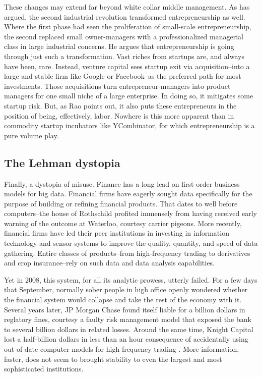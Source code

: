 \documentclass[12pt]{article}
\begin{document}
These changes may extend far beyond white collar middle management. As
\cite{rao2012} has argued, the second industrial revolution
transformed entrepreneurship as well. Where the first phase had seen
the proliferation of small-scale entrepreneurship, the second replaced
small owner-managers with a professionalized managerial class in large
industrial concerns. He argues that entrepreneurship is going through
just such a transformation. Vast riches from startups are, and always
have been, rare. Instead, venture capital sees startup exit via
acquisition--into a large and stable firm like Google or Facebook--as
the preferred path for most investments. Those acquisitions turn
entrepreneur-managers into product managers for one small niche of a
large enterprise. In doing so, it mitigates some startup risk. But, as
Rao points out, it also puts these entrepreneurs in the position of
being, effectively, labor. Nowhere is this more apparent than in
commodity startup incubators like YCombinator, for which
entrepreneurship is a pure volume play.


\subsection{The Lehman dystopia}
\label{sec:lehman-dystopia}

Finally, a dystopia of misuse. Finance has a long lead on first-order
business models for big data. Financial firms have eagerly sought data
specifically for the purpose of building or refining financial
products. That dates to well before computers--the house of Rothschild
profited immensely from having received early warning of the outcome
at Waterloo, courtesy carrier pigeons. More recently, financial firms
have led their peer institutions in investing in information
technology and sensor systems to improve the quality, quantity, and
speed of data gathering. Entire classes of products--from
high-frequency trading to derivatives and crop insurance--rely on such
data and data analysis capabilities.

Yet in 2008, this system, for all its analytic prowess, utterly
failed. For a few days that September, normally sober people in
high office openly wondered whether the financial system would
collapse and take the rest of the economy with it. Several years
later, JP Morgan Chase found itself liable for a billion dollars in
reglatory fines, courtesy a faulty risk management model that exposed
the bank to several billion dollars in related losses.\citep{kopecki2013} Around the same time,
Knight Capital lost a half-billion dollars in less than an hour
consequence of accidentally using out-of-date computer models for
high-frequency trading \citep{strasburg2012}. More information, faster, does not seem to
brought stability to even the largest and most sophisticated institutions.
\end{document}
